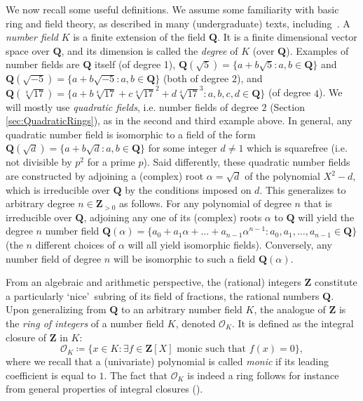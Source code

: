 \documentclass[sigplan,10pt,nonacm,
screen]{acmart} \settopmatter{printfolios=true,printccs=false,printacmref=false}
\newcommand{\QQ}{\mathbf{Q}}
\newcommand{\ZZ}{\mathbf{Z}}
\newcommand{\OK}{\mathcal{O}_K}
\begin{document}
We now recall some useful definitions. We assume some familiarity with basic ring and field theory, as described in many (undergraduate) texts, including~\cite{lang2005undergraduate, DummitFoote2004}.
A \emph{number field} $K$ is a finite extension of the field $\QQ$. It is a finite dimensional vector space over $\QQ$, and its dimension is called the \emph{degree} of $K$ (over $\QQ$).
Examples of number fields are $\QQ$ itself (of degree 1), $\QQ(\sqrt{5})=\{a+b\sqrt{5} : a,b \in \QQ\}$ and $\QQ(\sqrt{-5})=\{a+b \sqrt{-5} : a,b \in \QQ\}$ (both of degree $2$), 
and $\QQ(\sqrt[4]{17})=\{a+b\sqrt[4]{17}+c \sqrt[4]{17}^2 + d \sqrt[4]{17}^3 : a,b,c,d \in \QQ\}$ (of degree $4$).
We will mostly use \emph{quadratic fields}, i.e. number fields of degree $2$ (Section \ref{sec:QuadraticRings}), as in the second and third example above. In general, any quadratic number field is isomorphic to a field of the form $\QQ(\sqrt{d})=\{a+b\sqrt{d} : a, b \in \QQ\}$ for some integer $d\not=1$ which is squarefree (i.e. not divisible by $p^2$ for a prime $p$).
Said differently, these quadratic number fields are constructed by adjoining a (complex) root $\alpha=\sqrt{d}$ of the polynomial $X^2-d$, which is irreducible over $\QQ$ by the conditions imposed on $d$.
This generalizes to arbitrary degree $n \in \ZZ_{>0}$ as follows.
For any polynomial of degree $n$ that is irreducible over $\QQ$, adjoining any one of its (complex) roots $\alpha$ to $\QQ$ will yield the degree $n$ number field $\QQ(\alpha)=\{a_0+a_1 \alpha + \ldots + a_{n-1} \alpha^{n-1} : a_0, a_1, \ldots, a_{n-1} \in \QQ\}$ (the $n$ different choices of $\alpha$ will all yield isomorphic fields). Conversely, any number field of degree $n$ will be isomorphic to such a field $\QQ(\alpha)$.

From an algebraic and arithmetic perspective, the (rational) integers $\ZZ$ constitute a particularly \lq nice\rq\ subring of its field of fractions, the rational numbers $\QQ$. Upon generalizing from $\QQ$ to an arbitrary number field $K$, the analogue of $\ZZ$ is the \emph{ring of integers} of a number field $K$, denoted $\OK$. It is defined as the integral closure of $\ZZ$ in $K$:
\begin{equation*}
\OK\coloneqq \{ x \in K : \exists f \in \ZZ[X] \text{ monic such that } f(x)=0 \},
\end{equation*}
where we recall that a (univariate) polynomial is called \emph{monic} if its leading coefficient is equal to $1$.
The fact that $\OK$ is indeed a ring follows for instance from general properties of integral closures (\cite[Section I.2]{Neukirch}).
\end{document}
